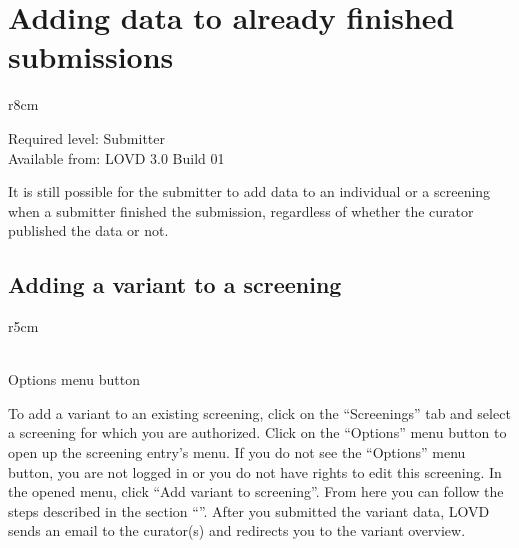 \hypertarget{sec:add_data_finished_submissions}{}
\section{Adding data to already finished submissions}
\begin{wrapfigure}[3]{r}{8cm} %
  \vspace{-25pt}
  \begin{leftbar}
    Required level: Submitter\\
    Available from: LOVD 3.0 Build 01
  \end{leftbar}
\end{wrapfigure}
It is still possible for the submitter to add data to an individual or a screening when a submitter finished
 the submission, regardless of whether the curator published the data or not.



\hypertarget{ssec:add_variant}{}
\subsection{Adding a variant to a screening}
\begin{wrapfigure}[4]{r}{5cm} %
  \vspace{-25pt}
  \begin{framed}
    \\Options menu button
  \end{framed}
\end{wrapfigure}
To add a variant to an existing screening, click on the ``Screenings'' tab and select
 a screening for which you are authorized.
Click on the ``Options'' menu button to open up the screening entry's menu.
If you do not see the ``Options'' menu button, you are not logged in or you do not have rights to edit this
 screening.
In the opened menu, click ``Add variant to screening''.
From here you can follow the steps described in the section ``''.
After you submitted the variant data, LOVD sends an email to the curator(s) and redirects you to the variant
 overview.



\hypertarget{ssec:add_screening}{}
